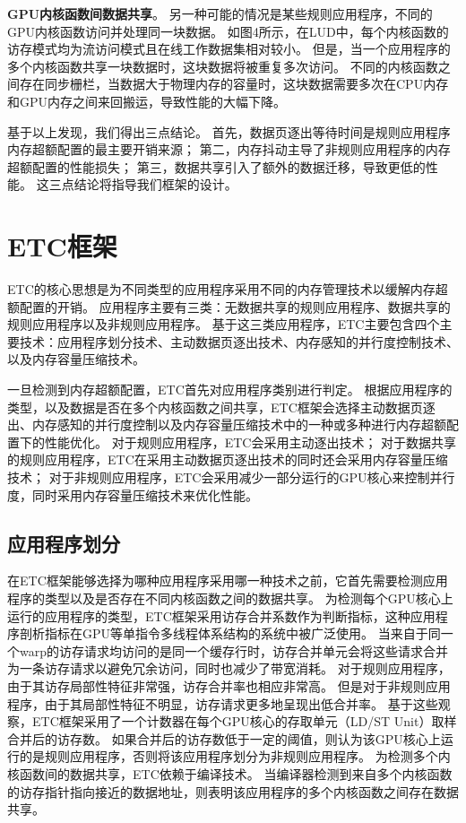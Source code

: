 \textbf{GPU内核函数间数据共享}。
另一种可能的情况是某些规则应用程序，不同的GPU内核函数访问并处理同一块数据。
如图4所示，在LUD中，每个内核函数的访存模式均为流访问模式且在线工作数据集相对较小。
但是，当一个应用程序的多个内核函数共享一块数据时，这块数据将被重复多次访问。
不同的内核函数之间存在同步栅栏，当数据大于物理内存的容量时，这块数据需要多次在CPU内存和GPU内存之间来回搬运，导致性能的大幅下降。

基于以上发现，我们得出三点结论。
首先，数据页逐出等待时间是规则应用程序内存超额配置的最主要开销来源；
第二，内存抖动主导了非规则应用程序的内存超额配置的性能损失；
第三，数据共享引入了额外的数据迁移，导致更低的性能。
这三点结论将指导我们框架的设计。

\section{ETC框架}
ETC的核心思想是为不同类型的应用程序采用不同的内存管理技术以缓解内存超额配置的开销。
应用程序主要有三类：无数据共享的规则应用程序、数据共享的规则应用程序以及非规则应用程序。
基于这三类应用程序，ETC主要包含四个主要技术：应用程序划分技术、主动数据页逐出技术、内存感知的并行度控制技术、以及内存容量压缩技术。

一旦检测到内存超额配置，ETC首先对应用程序类别进行判定。
根据应用程序的类型，以及数据是否在多个内核函数之间共享，ETC框架会选择主动数据页逐出、内存感知的并行度控制以及内存容量压缩技术中的一种或多种进行内存超额配置下的性能优化。
对于规则应用程序，ETC会采用主动逐出技术；
对于数据共享的规则应用程序，ETC在采用主动数据页逐出技术的同时还会采用内存容量压缩技术；
对于非规则应用程序，ETC会采用减少一部分运行的GPU核心来控制并行度，同时采用内存容量压缩技术来优化性能。

\subsection{应用程序划分}

在ETC框架能够选择为哪种应用程序采用哪一种技术之前，它首先需要检测应用程序的类型以及是否存在不同内核函数之间的数据共享。
为检测每个GPU核心上运行的应用程序的类型，ETC框架采用访存合并系数作为判断指标，这种应用程序剖析指标在GPU等单指令多线程体系结构的系统中被广泛使用。
当来自于同一个warp的访存请求均访问的是同一个缓存行时，访存合并单元会将这些请求合并为一条访存请求以避免冗余访问，同时也减少了带宽消耗。
对于规则应用程序，由于其访存局部性特征非常强，访存合并率也相应非常高。
但是对于非规则应用程序，由于其局部性特征不明显，访存请求更多地呈现出低合并率。
基于这些观察，ETC框架采用了一个计数器在每个GPU核心的存取单元（LD/ST Unit）取样合并后的访存数。
如果合并后的访存数低于一定的阈值，则认为该GPU核心上运行的是规则应用程序，否则将该应用程序划分为非规则应用程序。
为检测多个内核函数间的数据共享，ETC依赖于编译技术。
当编译器检测到来自多个内核函数的访存指针指向接近的数据地址，则表明该应用程序的多个内核函数之间存在数据共享。


